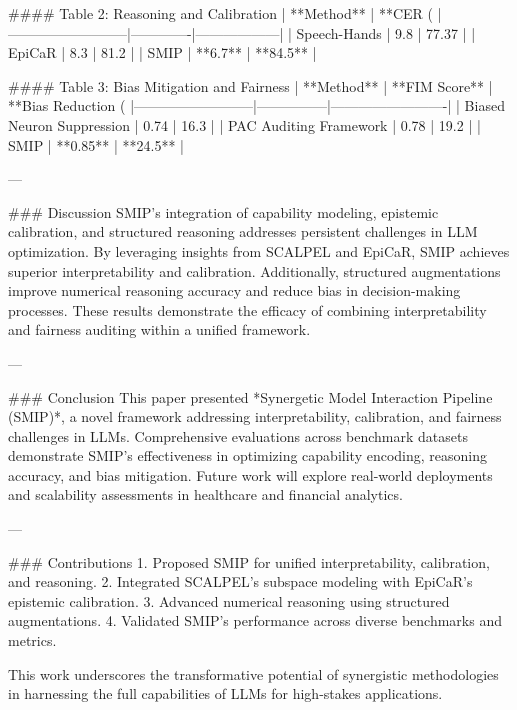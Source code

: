 #### Table 2: Reasoning and Calibration  
| **Method**              | **CER (%
|--------------------------|-------------|------------------|  
| Speech-Hands            | 9.8         | 77.37            |  
| EpiCaR                  | 8.3         | 81.2             |  
| SMIP                    | **6.7**     | **84.5**         |  

#### Table 3: Bias Mitigation and Fairness  
| **Method**              | **FIM Score** | **Bias Reduction (%
|--------------------------|---------------|-------------------------|  
| Biased Neuron Suppression | 0.74          | 16.3                    |  
| PAC Auditing Framework   | 0.78          | 19.2                    |  
| SMIP                    | **0.85**      | **24.5**                |  

---

### Discussion  
SMIP's integration of capability modeling, epistemic calibration, and structured reasoning addresses persistent challenges in LLM optimization. By leveraging insights from SCALPEL and EpiCaR, SMIP achieves superior interpretability and calibration. Additionally, structured augmentations improve numerical reasoning accuracy and reduce bias in decision-making processes. These results demonstrate the efficacy of combining interpretability and fairness auditing within a unified framework.

---

### Conclusion  
This paper presented *Synergetic Model Interaction Pipeline (SMIP)*, a novel framework addressing interpretability, calibration, and fairness challenges in LLMs. Comprehensive evaluations across benchmark datasets demonstrate SMIP's effectiveness in optimizing capability encoding, reasoning accuracy, and bias mitigation. Future work will explore real-world deployments and scalability assessments in healthcare and financial analytics.

---

### Contributions  
1. Proposed SMIP for unified interpretability, calibration, and reasoning.  
2. Integrated SCALPEL's subspace modeling with EpiCaR's epistemic calibration.  
3. Advanced numerical reasoning using structured augmentations.  
4. Validated SMIP's performance across diverse benchmarks and metrics.  

This work underscores the transformative potential of synergistic methodologies in harnessing the full capabilities of LLMs for high-stakes applications.
